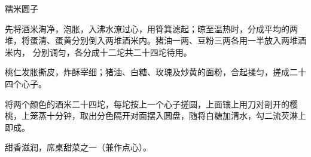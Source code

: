 %
%
%
%
%
%
%
\begin{recipe}[珍珠圆子]{糯米圆子}

\ingredients


\preparation

\step 先将酒米淘净，泡胀，入沸水潦过心，用筲箕滤起；晾至温热时，分成平均的两
堆，将蛋清、蛋黄分别倒入两堆酒米内。猪油一两、豆粉三两各用一半放入两堆酒米内，
分别调匀，各分成十二坨共二十四坨待用。

\step 桃仁发胀撕皮，炸酥宰细；猪油、白糖、玫瑰及炒黄的面粉，合起揉匀，搓成二十
四个心子。

\step 将两个颜色的酒米二十四坨，每坨按上一个心子搓圆，上面镶上用刀对剖开的樱
桃，上笼蒸十分钟，取出分色隔开对面摆入圆盘，随将白糖加清水，勾二流芡淋上即成。

\features

甜香滋润，席桌甜菜之一（兼作点心）。

\end{recipe}

